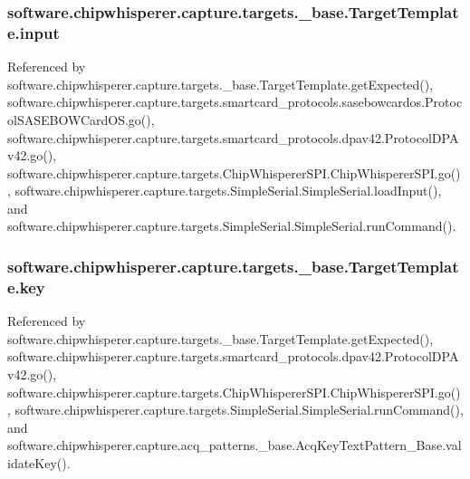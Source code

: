 \subsubsection[{input}]{\setlength{\rightskip}{0pt plus 5cm}software.\+chipwhisperer.\+capture.\+targets.\+\_\+base.\+Target\+Template.\+input}\label{classsoftware_1_1chipwhisperer_1_1capture_1_1targets_1_1__base_1_1TargetTemplate_a48a15030a8ca5b5d9ab19e5dec55097e}


Referenced by software.\+chipwhisperer.\+capture.\+targets.\+\_\+base.\+Target\+Template.\+get\+Expected(), software.\+chipwhisperer.\+capture.\+targets.\+smartcard\+\_\+protocols.\+sasebowcardos.\+Protocol\+S\+A\+S\+E\+B\+O\+W\+Card\+O\+S.\+go(), software.\+chipwhisperer.\+capture.\+targets.\+smartcard\+\_\+protocols.\+dpav42.\+Protocol\+D\+P\+Av42.\+go(), software.\+chipwhisperer.\+capture.\+targets.\+Chip\+Whisperer\+S\+P\+I.\+Chip\+Whisperer\+S\+P\+I.\+go(), software.\+chipwhisperer.\+capture.\+targets.\+Simple\+Serial.\+Simple\+Serial.\+load\+Input(), and software.\+chipwhisperer.\+capture.\+targets.\+Simple\+Serial.\+Simple\+Serial.\+run\+Command().

\hypertarget{classsoftware_1_1chipwhisperer_1_1capture_1_1targets_1_1__base_1_1TargetTemplate_a782679d4a225fbcd21ba12d652c2fda6}{}
\subsubsection[{key}]{\setlength{\rightskip}{0pt plus 5cm}software.\+chipwhisperer.\+capture.\+targets.\+\_\+base.\+Target\+Template.\+key}\label{classsoftware_1_1chipwhisperer_1_1capture_1_1targets_1_1__base_1_1TargetTemplate_a782679d4a225fbcd21ba12d652c2fda6}


Referenced by software.\+chipwhisperer.\+capture.\+targets.\+\_\+base.\+Target\+Template.\+get\+Expected(), software.\+chipwhisperer.\+capture.\+targets.\+smartcard\+\_\+protocols.\+dpav42.\+Protocol\+D\+P\+Av42.\+go(), software.\+chipwhisperer.\+capture.\+targets.\+Chip\+Whisperer\+S\+P\+I.\+Chip\+Whisperer\+S\+P\+I.\+go(), software.\+chipwhisperer.\+capture.\+targets.\+Simple\+Serial.\+Simple\+Serial.\+run\+Command(), and software.\+chipwhisperer.\+capture.\+acq\+\_\+patterns.\+\_\+base.\+Acq\+Key\+Text\+Pattern\+\_\+\+Base.\+validate\+Key().

